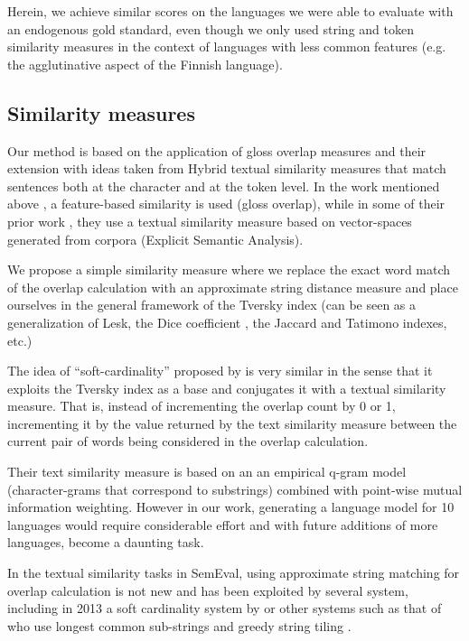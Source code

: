 \documentclass[10pt, a4paper]{article}
\begin{document}
Herein, we achieve similar scores on the languages we were able to evaluate with an endogenous gold standard, even though we only used string and token similarity measures in the context of languages with less common features (e.g. the agglutinative aspect of the Finnish language).

\subsection{Similarity measures}
Our method is based on the application of gloss overlap measures and their extension with ideas taken from Hybrid textual similarity measures that match sentences both at the character and at the token level. In the work mentioned above \cite{meyer-gurevych:2012:PAPERS}, a feature-based similarity is used (gloss overlap), while in some of their prior work \cite{MeyerGurevych:2010},  they use a textual similarity measure based on vector-spaces generated from corpora (Explicit Semantic Analysis).

We propose a simple similarity measure where we replace the exact word match of the overlap calculation with an approximate string distance measure and place ourselves in the general framework of the Tversky \cite{tversky77similarity} index (can be seen as a generalization of Lesk, the Dice coefficient , the Jaccard and Tatimono indexes, etc.)

The idea of ``soft-cardinality'' proposed by \cite{Jimenez2010,Jimenez2012} is very similar in the sense that it exploits the Tversky index as a base and conjugates it with a textual similarity measure. That is, instead of incrementing the overlap count by 0 or 1, incrementing it by the value returned by the text similarity measure between the current pair of words being considered in the overlap calculation.
 
Their text similarity measure is based on an an empirical q-gram model (character-grams that correspond to substrings) combined with point-wise mutual information weighting. However in our work, generating a language model for 10 languages would require considerable effort and with future additions of more languages, become a daunting task. 
  
In the textual similarity tasks in SemEval, using approximate string matching for overlap calculation is not new and has been exploited by several system, including in 2013 a soft cardinality system by \cite{Jimenez2013} or other systems such as that of \cite{Wu2013} who use longest common sub-strings and greedy string tiling .
 
\end{document}
